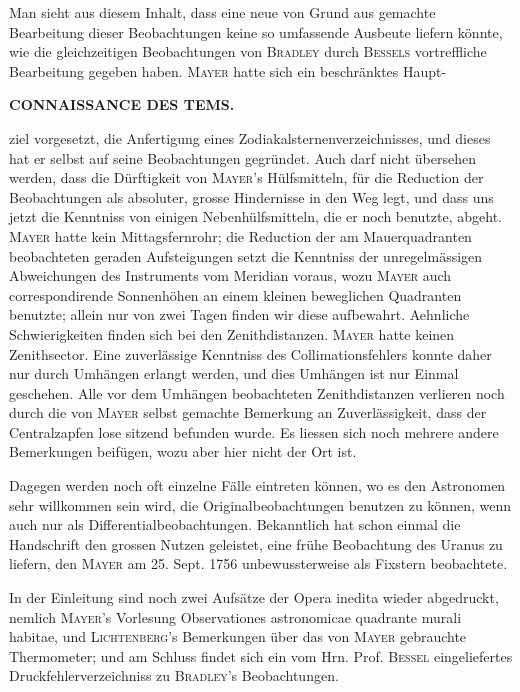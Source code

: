 Man sieht aus diesem Inhalt, dass eine neue von Grund aus gemachte Bearbeitung dieser Beobachtungen keine so umfassende Ausbeute liefern könnte, wie die gleichzeitigen Beobachtungen von \textsc{Bradley} durch \textsc{Bessels} vortreffliche Bearbeitung gegeben haben. \textsc{Mayer} hatte sich ein beschränktes Haupt-
\par\clearpage\thispagestyle{empty}
\fancyhead[L]{}
\noindent\makebox[12mm][l]{\large\bfseries }\parbox[t]{\dimexpr\linewidth-24mm\relax}{\centering\scriptsize\bfseries CONNAISSANCE DES TEMS.}\par\nobreak\medskip\noindent ziel vorgesetzt, die Anfertigung eines Zodiakalsternenverzeichnisses, und dieses hat er selbst auf seine Beobachtungen gegründet. Auch darf nicht übersehen werden, dass die Dürftigkeit von \textsc{Mayer}'s Hülfsmitteln, für die Reduction der Beobachtungen als absoluter, grosse Hindernisse in den Weg legt, und dass uns jetzt die Kenntniss von einigen Nebenhülfsmitteln, die er noch benutzte, abgeht. \textsc{Mayer} hatte kein Mittagsfernrohr; die Reduction der am Mauerquadranten beobachteten geraden Aufsteigungen setzt die Kenntniss der unregelmässigen Abweichungen des Instruments vom Meridian voraus, wozu \textsc{Mayer} auch correspondirende Sonnenhöhen an einem kleinen beweglichen Quadranten benutzte; allein nur von zwei Tagen finden wir diese aufbewahrt. Aehnliche Schwierigkeiten finden sich bei den Zenithdistanzen. \textsc{Mayer} hatte keinen Zenithsector. Eine zuverlässige Kenntniss des Collimationsfehlers konnte daher nur durch Umhängen erlangt werden, und dies Umhängen ist nur Einmal geschehen. Alle vor dem Umhängen beobachteten Zenithdistanzen verlieren noch durch die von \textsc{Mayer} selbst gemachte Bemerkung an Zuverlässigkeit, dass der Centralzapfen lose sitzend befunden wurde. Es liessen sich noch mehrere andere Bemerkungen beifügen, wozu aber hier nicht der Ort ist.

Dagegen werden noch oft einzelne Fälle eintreten können, wo es den Astronomen sehr willkommen sein wird, die Originalbeobachtungen benutzen zu können, wenn auch nur als Differentialbeobachtungen. Bekanntlich hat schon einmal die Handschrift den grossen Nutzen geleistet, eine frühe Beobachtung des Uranus zu liefern, den \textsc{Mayer} am 25. Sept. 1756 unbewussterweise als Fixstern beobachtete.

In der Einleitung sind noch zwei Aufsätze der Opera inedita wieder abgedruckt, nemlich \textsc{Mayer}'s Vorlesung Observationes astronomicae quadrante murali habitae, und \textsc{Lichtenberg}'s Bemerkungen über das von \textsc{Mayer} gebrauchte Thermometer; und am Schluss findet sich ein vom Hrn. Prof. \textsc{Bessel} eingeliefertes Druckfehlerverzeichniss zu \textsc{Bradley}'s Beobachtungen.
